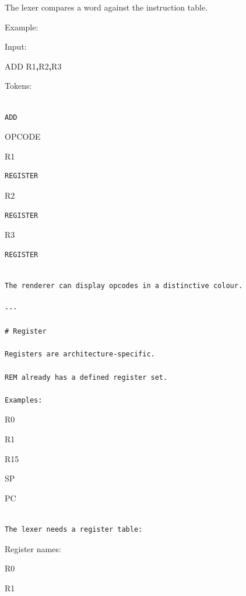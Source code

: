 \documentclass[
  oneside,
  openany]{book}
\newenvironment{Shaded}{\begin{snugshade}}{\end{snugshade}}
\newcommand{\BuiltInTok}[1]{#1}
\newcommand{\NormalTok}[1]{#1}
\newcommand{\OperatorTok}[1]{\textcolor[rgb]{0.81,0.36,0.00}{\textbf{#1}}}
\begin{document}
The lexer compares a word against the instruction table.

Example:

Input:

\begin{Shaded}
\begin{Highlighting}[]
\BuiltInTok{ADD}\NormalTok{ R1}\OperatorTok{,}\NormalTok{R2}\OperatorTok{,}\NormalTok{R3}
\end{Highlighting}
\end{Shaded}

Tokens:

\begin{verbatim}

ADD
\end{verbatim}

OPCODE 

R1

\begin{verbatim}
REGISTER
\end{verbatim}

R2

\begin{verbatim}
REGISTER
\end{verbatim}

R3

\begin{verbatim}
REGISTER
\end{verbatim}

\begin{verbatim}

The renderer can display opcodes in a distinctive colour.

---

# Register

Registers are architecture-specific.

REM already has a defined register set.

Examples:
\end{verbatim}

R0

R1

R15

SP

PC

\begin{verbatim}

The lexer needs a register table:
\end{verbatim}

Register names:

R0

R1
\end{document}
